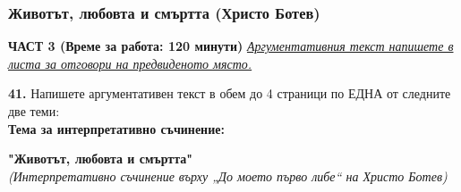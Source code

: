 \documentclass[12pt,a4paper]{article}
\begin{document}
\subsubsection{Животът, любовта и смъртта (Христо Ботев)}
\vspace{0.5cm}
\begin{center}
\textbf{ЧАСТ 3 (Време за работа: 120 минути)}
\vspace{0.2cm}
{\textit{\underline{Аргументативния текст напишете в листа за отговори на предвиденото място.}}}
\vspace{0.1cm}
\end{center}
\textbf{41.} Напишете аргументативен текст в обем до 4 страници по ЕДНА от следните две теми:
\\
\vspace{0.2cm}
\textbf{Тема за интерпретативно съчинение:}
\vspace{0.1cm}
\begin{center}
\textbf{"Животът, любовта и смъртта"}
\\
\textit{(Интерпретативно съчинение върху „До моето първо либе“ на Христо Ботев)}
\end{center}
\end{document}
